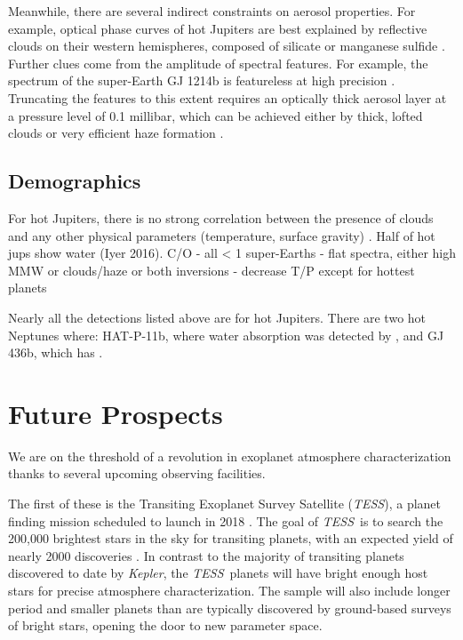 \documentclass[graybox,natbib,nosecnum]{svmult}
\newcommand{\project}[1]{\textsl{#1}}
\newcommand{\TESS}{\project{TESS}}
\newcommand{\Kepler}{\project{Kepler}}
\begin{document}
Meanwhile, there are several indirect constraints on aerosol properties.  For example, optical phase curves of hot Jupiters are best explained by reflective clouds on their western hemispheres, composed of silicate or manganese sulfide \citep{demory13, oreshenko16, parmentier16}. Further clues come from the amplitude of spectral features. For example, the spectrum of the super-Earth GJ 1214b is featureless at high precision \citep[30 ppm,][]{kreidberg14a}.  Truncating the features to this extent requires an optically thick aerosol layer at a pressure level of 0.1 millibar, which can be achieved either by thick, lofted clouds or very efficient haze formation \citep{morley15}.  

\subsection{Demographics}
For hot Jupiters, there is no strong correlation between the presence of clouds and any other physical parameters (temperature, surface gravity) \citep{sing16}. Half of hot jups show water (Iyer 2016).
C/O - all < 1
super-Earths - flat spectra, either high MMW or clouds/haze or both
inversions - decrease T/P except for hottest planets 

Nearly all the detections listed above are for hot Jupiters. There are two hot Neptunes where: HAT-P-11b, where water absorption was detected by \cite{fraine15}, and GJ 436b, which has \citep{stevenson10, morley17, FIXME}. 

\section{Future Prospects}
We are on the threshold of a revolution in exoplanet atmosphere characterization thanks to several upcoming observing facilities. 

The first of these is the Transiting Exoplanet Survey Satellite (\TESS), a planet finding mission scheduled to launch in 2018 \citep{ricker14}.  The goal of \TESS\ is to search the 200,000 brightest stars in the sky for transiting planets, with an expected yield of nearly 2000 discoveries \citep{sullivan15}. In contrast to the majority of transiting planets discovered to date by \Kepler \citep{}, the \TESS\ planets will have bright enough host stars for precise atmosphere characterization. The sample will also include longer period and smaller planets than are typically discovered by ground-based surveys of bright stars, opening the door to new parameter space. 
\end{document}
